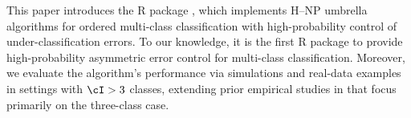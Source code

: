 

This paper introduces the R package \href{https://cran.r-project.org/web/packages/HNPclassifier/index.html}{}, which implements H--NP umbrella algorithms for ordered multi-class classification with high-probability control of under-classification errors. To our knowledge, it is the first R package to provide high-probability asymmetric error control for multi-class classification. Moreover, we evaluate the algorithm’s performance via simulations and real-data examples in settings with $\cI > 3$  classes, extending prior empirical studies in \cite{wang2024hierarchical} that focus primarily on the three-class case. 




